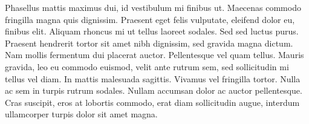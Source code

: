 \documentclass[conference]{IEEEtran}
\begin{document}
Phasellus mattis maximus dui, id vestibulum mi finibus ut. Maecenas commodo fringilla magna quis dignissim. Praesent eget felis vulputate, eleifend dolor eu, finibus elit. Aliquam rhoncus mi ut tellus laoreet sodales. Sed sed luctus purus. Praesent hendrerit tortor sit amet nibh dignissim, sed gravida magna dictum. Nam mollis fermentum dui placerat auctor. Pellentesque vel quam tellus. Mauris gravida, leo eu commodo euismod, velit ante rutrum sem, sed sollicitudin mi tellus vel diam. In mattis malesuada sagittis. Vivamus vel fringilla tortor. Nulla ac sem in turpis rutrum sodales. Nullam accumsan dolor ac auctor pellentesque. Cras suscipit, eros at lobortis commodo, erat diam sollicitudin augue, interdum ullamcorper turpis dolor sit amet magna. 
\end{document}
